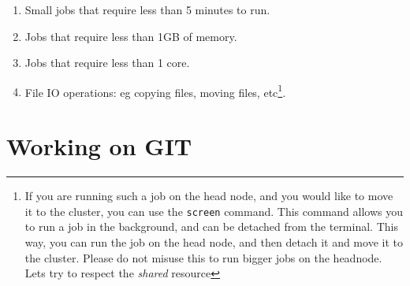 \documentclass{article}
\begin{document}
\begin{enumerate}
    \item Small jobs that require less than 5 minutes to run.
    \item Jobs that require less than 1GB of memory.
    \item Jobs that require less than 1 core.
    \item File IO operations: eg copying files, moving files, etc\footnote{If you are running such a job on the head node, and you would like to move it to the cluster, you can use the \texttt{screen} command. This command allows you to run a job in the background, and can be detached from the terminal. This way, you can run the job on the head node, and then detach it and move it to the cluster. Please do not misuse this to run bigger jobs on the headnode. Lets try to respect the \textit{shared} resource}.
\end{enumerate}






    

\section{Working on GIT}
\end{document}
